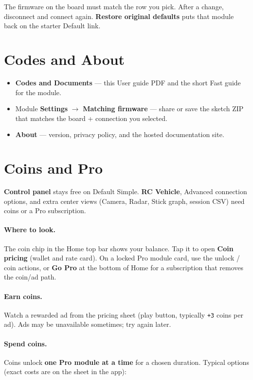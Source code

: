 \documentclass[12pt,a4paper]{article}
\newcommand{\ui}[1]{\textsf{\textbf{#1}}}
\begin{document}
The firmware on the board must match the row you pick.
After a change, disconnect and connect again.
\ui{Restore original defaults} puts that module back on the starter Default
link.

\section{Codes and About}
\label{sec:docs}

\begin{itemize}[leftmargin=1.4cm]
  \item \ui{Codes and Documents} --- this User guide PDF and the short Fast
        guide for the module.
  \item Module \ui{Settings} $\rightarrow$ \ui{Matching firmware} --- share or
        save the sketch ZIP that matches the board + connection you selected.
  \item \ui{About} --- version, privacy policy, and the hosted documentation
        site.
\end{itemize}

\section{Coins and Pro}
\label{sec:coins}

\ui{Control panel} stays free on Default Simple.
\ui{RC Vehicle}, Advanced connection options, and extra center views
(Camera, Radar, Stick graph, session CSV) need coins or a Pro subscription.

\paragraph{Where to look.}
The coin chip in the Home top bar shows your balance.
Tap it to open \ui{Coin pricing} (wallet and rate card).
On a locked Pro module card, use the unlock / coin actions, or
\ui{Go Pro} at the bottom of Home for a subscription that removes the
coin/ad path.

\paragraph{Earn coins.}
Watch a rewarded ad from the pricing sheet (play button, typically
\texttt{+3} coins per ad). Ads may be unavailable sometimes; try again
later.

\paragraph{Spend coins.}
Coins unlock \textbf{one Pro module at a time} for a chosen duration.
Typical options (exact costs are on the sheet in the app):
\end{document}
